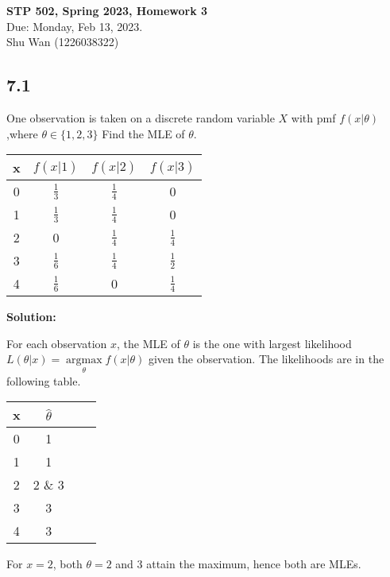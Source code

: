 \documentclass[11pt]{article}
\newcommand{\Sol}{\par {\bf Solution:}}
\DeclareMathOperator*{\argmax}{\arg\max}
\begin{document}
\begin{center}
\Large{
\textbf{STP 502, Spring 2023, Homework 3} \\
Due: Monday, Feb 13, 2023. \\
Shu Wan (1226038322)
}
\end{center}



\subsection*{7.1} 
One observation is taken on a discrete random variable $X$ with pmf $f(x|\theta)$ ,where $\theta \in \{1,2,3\}$ Find the MLE of $\theta$.

\begin{table}[h]
\centering
\begin{tabular}{cccc}
\hline
x & $f(x|1)$  & $f(x|2)$   & $f(x|3)$ \\ \hline
0 & $\frac{1}{3}$ & $\frac{1}{4}$ & 0 \\
1 & $\frac{1}{3}$  & $\frac{1}{4}$    & 0 \\
2 & 0  & $\frac{1}{4}$   & $\frac{1}{4}$ \\
3 & $\frac{1}{6}$  & $\frac{1}{4}$    & $\frac{1}{2}$ \\
4 & $\frac{1}{6}$  & 0    & $\frac{1}{4}$ \\ \hline
\end{tabular}
\end{table}

\Sol

For each observation $x$, the MLE of $\theta$ is the one with largest likelihood $L(\theta | x) = \argmax \limits_\theta f(x|\theta)$ given the observation.
The likelihoods are in the following table.

\begin{table}[h]
\centering
\begin{tabular}{cccc}
\hline
x & $\hat \theta$  \\ \hline
0 & 1  \\
1 & 1   \\
2 & 2 \& 3  \\
3 & 3  \\
4 & 3 \\ \hline
\end{tabular}
\end{table}

For $x=2$, both $\theta = 2$ and 3 attain the maximum, hence both are MLEs.
\end{document}
